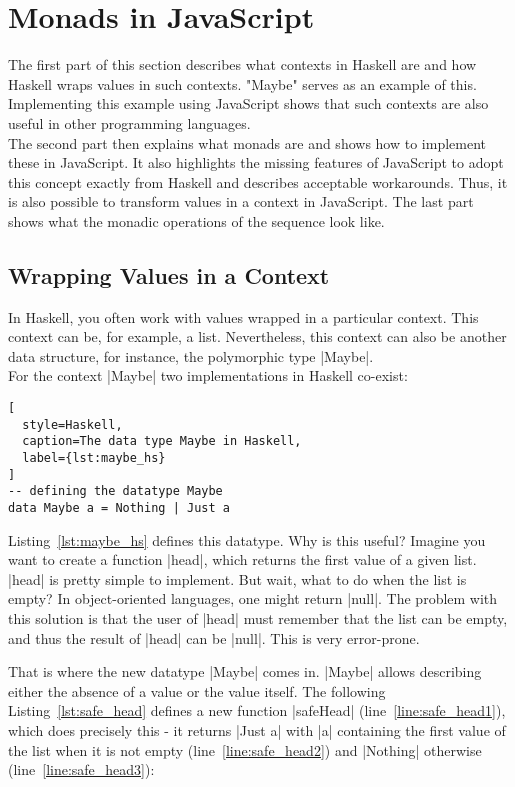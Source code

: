 \chapter{Monads in JavaScript} %
\label{chap:Monads in JavaScript}
The first part of this section describes what contexts in Haskell are and how
Haskell wraps values in such contexts. "Maybe" serves as an example of this.
Implementing this example using JavaScript shows that such contexts are also
useful in other programming languages.\\
The second part then explains what monads are and shows how to implement these
in JavaScript. It also highlights the missing features of JavaScript to adopt
this concept exactly from Haskell and describes acceptable workarounds. Thus, it
is also possible to transform values in a context in JavaScript. The
last part shows what the monadic operations of the sequence look like.

\section{Wrapping Values in a Context} %
\label{sec:Wrapping values in a context}
In Haskell, you often work with values wrapped in a particular context. This
context can be, for example, a list. Nevertheless, this context can also be
another data structure, for instance, the polymorphic type |Maybe|. \\
For the context |Maybe| two implementations in Haskell co-exist:

\begin{lstlisting}[
  style=Haskell,
  caption=The data type Maybe in Haskell,
  label={lst:maybe_hs}
]
-- defining the datatype Maybe
data Maybe a = Nothing | Just a
\end{lstlisting}

Listing~\ref{lst:maybe_hs} defines this datatype. Why is this useful?
Imagine you want to create a function |head|, which returns the first value of
a given list. |head| is pretty simple to implement. But wait, what to do when
the list is empty? In object-oriented languages, one might return |null|. The
problem with this solution is that the user of |head| must remember that the
list can be empty, and thus the result of |head| can be |null|. This is very
error-prone.

That is where the new datatype |Maybe| comes in. |Maybe| allows describing
either the absence of a value or the value itself. The following
Listing~\ref{lst:safe_head} defines a new function |safeHead|
(line~\ref{line:safe_head1}), which does precisely this - it returns |Just a|
with |a| containing the first value of the list when it is not empty
(line~\ref{line:safe_head2}) and |Nothing| otherwise (line~\ref{line:safe_head3}):

